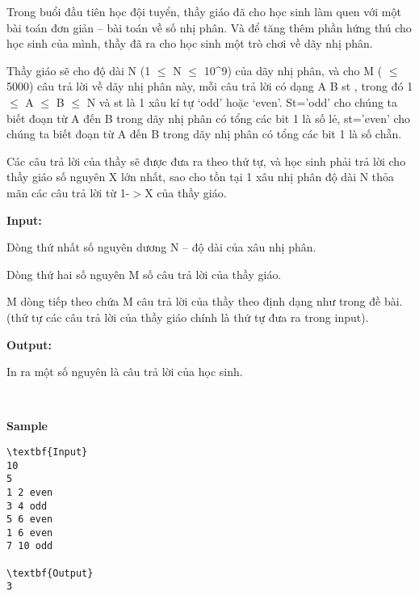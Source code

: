 

Trong buổi đầu tiên học đội tuyển, thầy giáo đã cho học sinh làm quen với một bài toán đơn giản – bài toán về số nhị phân. Và để tăng thêm phần hứng thú cho học sinh của mình, thầy đã ra cho học sinh một trò chơi về dãy nhị phân.

Thầy giáo sẽ cho độ dài N (1 $\le$ N $\le$ 10\textasciicircum9) của dãy nhị phân, và cho M ( $\le$ 5000) câu trả lời về dãy nhị phân này, mỗi câu trả lời có dạng A B st , trong đó 1 $\le$ A $\le$ B $\le$ N và st là 1 xâu kí tự ‘odd’ hoặc ‘even’. St=’odd’ cho chúng ta biết đoạn từ A đến B trong dãy nhị phân có tổng các bit 1 là số lẻ, st=’even’ cho chúng ta biết đoạn từ A đến B trong dãy nhị phân có tổng các bit 1 là số chẵn.

Các câu trả lời của thầy sẽ được đưa ra theo thứ tự, và học sinh phải trả lời cho thầy giáo số nguyên X lớn nhất, sao cho tồn tại 1 xâu nhị phân độ dài N thỏa mãn các câu trả lời từ 1-$>$X của thầy giáo.

\textbf{Input:}

Dòng thứ nhất số nguyên dương N – độ dài của xâu nhị phân.

Dòng thứ hai số nguyên M số câu trả lời của thầy giáo.

M dòng tiếp theo chứa M câu trả lời của thầy theo định dạng như trong đề bài. (thứ tự các câu trả lời của thầy giáo chính là thứ tự đưa ra trong input).

\textbf{Output:}

In ra một số nguyên là câu trả lời của học sinh.

 

\textbf{Sample}
\begin{verbatim}
\textbf{Input}
10
5
1 2 even
3 4 odd
5 6 even
1 6 even
7 10 odd

\textbf{Output}
3\end{verbatim}
